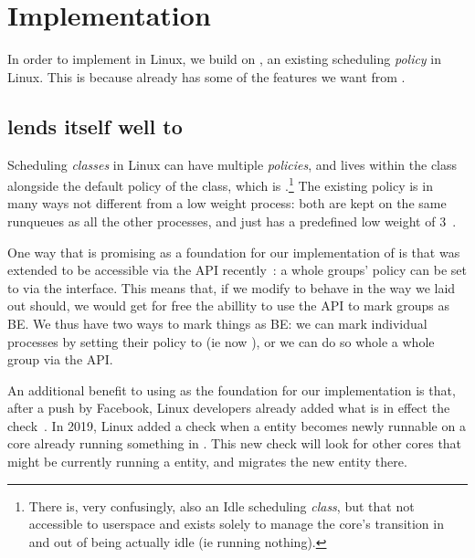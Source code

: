 \section{Implementation}\label{s:implementation}


In order to implement \beclass{} in Linux, we build on \schedidle{}, an existing
scheduling \textit{policy} in Linux. This is because \schedidle{} already has
some of the features we want from \beclass{}.

\subsection{\schedidle{} lends itself well to \beclass{}}

Scheduling \textit{classes} in Linux can have multiple \textit{policies}, and
\schedidle{} lives within the \normalclass{} class alongside the default policy
of the \normalclass{} class, which is \schednormal{}.\footnote{There is, very
confusingly, also an Idle scheduling \textit{class}, but that not accessible to
userspace and exists solely to manage the core's transition in and out of being
actually idle (ie running nothing).} The existing \schedidle{} policy is in many
ways not different from a low weight \schednormal{} process: both are kept on
the same runqueues as all the other \schednormal{} processes, and \schedidle{}
just has a predefined low weight of 3~\cite{weight-idleprio}.

One way that \schedidle{} is promising as a foundation for our implementation of
\beclass{} is that \schedidle{} was extended to be accessible via the \cgroups{}
API recently~\cite{lkml-idle-cgroup}: a whole groups' policy can be set to
\schedidle{} via the \cgroups{} interface. This means that, if we modify
\schedidle{} to behave in the way we laid out \beclass{} should, we would get
for free the abillity to use the \cgroups{} API to mark groups as BE. We thus
have two ways to mark things as BE: we can mark individual processes by setting
their policy to \schedidle{} (ie now \schedbe{}), or we can do so whole a whole
group via the \cgroups{} API.

An additional benefit to using \schedidle{} as the foundation for our
implementation is that, after a push by Facebook, Linux developers already added
what is in effect the \entry{} check~\cite{fixing-idle-article}. In 2019, Linux
added a check when a \schednormal{} entity becomes newly runnable on a core
already running something in \schednormal{}. This new check will look for other
cores that might be currently running a \schedidle{} entity, and migrates the
new entity there.

